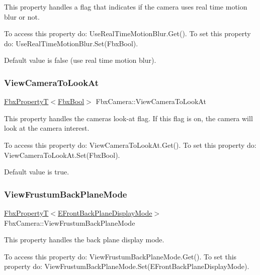 This property handles a flag that indicates if the camera uses real time motion blur or not.

To access this property do\+: Use\+Real\+Time\+Motion\+Blur.\+Get(). To set this property do\+: Use\+Real\+Time\+Motion\+Blur.\+Set(\+Fbx\+Bool).

Default value is false (use real time motion blur). \mbox{\label{class_fbx_camera_a9c44e5ed7154bb5b69664bbe4e7a7f51}} 
\subsubsection{\texorpdfstring{View\+Camera\+To\+Look\+At}{ViewCameraToLookAt}}
{\footnotesize\ttfamily \hyperlink{class_fbx_property_t}{Fbx\+PropertyT}$<$\hyperlink{fbxtypes_8h_a92e0562b2fe33e76a242f498b362262e}{Fbx\+Bool}$>$ Fbx\+Camera\+::\+View\+Camera\+To\+Look\+At}

This property handles the camera\textquotesingle{}s look-\/at flag. If this flag is on, the camera will look at the camera interest.

To access this property do\+: View\+Camera\+To\+Look\+At.\+Get(). To set this property do\+: View\+Camera\+To\+Look\+At.\+Set(\+Fbx\+Bool).

Default value is true. \mbox{\label{class_fbx_camera_aee58e80280621397eccfaf92ac30e914}} 
\subsubsection{\texorpdfstring{View\+Frustum\+Back\+Plane\+Mode}{ViewFrustumBackPlaneMode}}
{\footnotesize\ttfamily \hyperlink{class_fbx_property_t}{Fbx\+PropertyT}$<$\hyperlink{class_fbx_camera_ab7b9d3e546552049a79261a444f9b44a}{E\+Front\+Back\+Plane\+Display\+Mode}$>$ Fbx\+Camera\+::\+View\+Frustum\+Back\+Plane\+Mode}

This property handles the back plane display mode.

To access this property do\+: View\+Frustum\+Back\+Plane\+Mode.\+Get(). To set this property do\+: View\+Frustum\+Back\+Plane\+Mode.\+Set(\+E\+Front\+Back\+Plane\+Display\+Mode).


